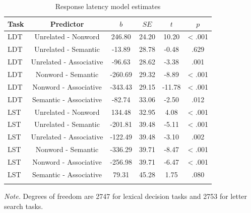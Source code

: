 \documentclass[english,man]{apa6}
\theoremstyle{definition}
\theoremstyle{definition}
\theoremstyle{definition}
\theoremstyle{remark}
\begin{document}
\begin{table}[tbp]
\begin{center}
\begin{threeparttable}
\caption{\label{tab:RT-table-est}Response latency model estimates}
\begin{tabular}{lccccc}
\toprule
Task & Predictor & $b$ & $SE$ & $t$ & $p$\\
\midrule
LDT & Unrelated - Nonword & 246.80 & 24.20 & 10.20 & < .001\\
LDT & Unrelated - Semantic & -13.89 & 28.78 & -0.48 & .629\\
LDT & Unrelated - Associative & -96.63 & 28.62 & -3.38 & .001\\
LDT & Nonword - Semantic & -260.69 & 29.32 & -8.89 & < .001\\
LDT & Nonword - Associative & -343.43 & 29.15 & -11.78 & < .001\\
LDT & Semantic - Associative & -82.74 & 33.06 & -2.50 & .012\\
LST & Unrelated - Nonword & 134.48 & 32.95 & 4.08 & < .001\\
LST & Unrelated - Semantic & -201.81 & 39.48 & -5.11 & < .001\\
LST & Unrelated - Associative & -122.49 & 39.48 & -3.10 & .002\\
LST & Nonword - Semantic & -336.29 & 39.71 & -8.47 & < .001\\
LST & Nonword - Associative & -256.98 & 39.71 & -6.47 & < .001\\
LST & Semantic - Associative & 79.31 & 45.28 & 1.75 & .080\\
\bottomrule
\addlinespace
\end{tabular}
\begin{tablenotes}[para]
\textit{Note.} Degrees of freedom are 2747 for lexical decision tasks and 2753 for letter search tasks.
\end{tablenotes}
\end{threeparttable}
\end{center}
\end{table}
\end{document}
